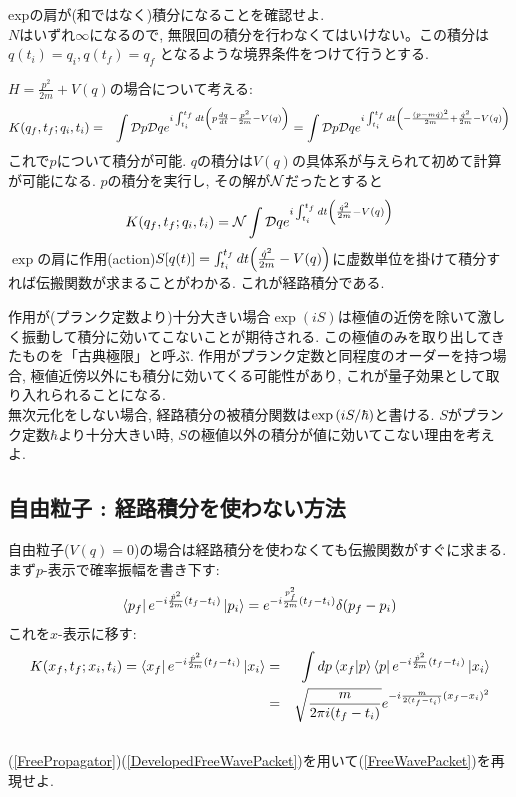 \documentclass[10.5pt,a4paper]{jreport}
\begin{document}
 expの肩が(和ではなく)積分になることを確認せよ.\\

$N$はいずれ$\infty$になるので, 無限回の積分を行わなくてはいけない。この積分は $q(t_i) = q_i, q(t_f) = q_f$ となるような境界条件をつけて行うとする.

$H = \frac{p^2}{2m} + V(q)$の場合について考える:
\begin{eqnarray}
  K(q_f, t_f;q_i, t_i) &=& \int {\cal D}p{\cal D}qe^{i\int_{t_i}^{t_f}dt\qty(p\frac{dq}{dt} - \frac{p^2}{2m} - V(q))} = \int {\cal D}p{\cal D}qe^{i\int_{t_i}^{t_f}dt\qty(-\frac{(p-m\dot{q})^2}{2m} + \frac{\dot{q}^2}{2m} - V(q))}
\end{eqnarray}
これで$p$について積分が可能. $q$の積分は$V(q)$の具体系が与えられて初めて計算が可能になる. $p$の積分を実行し, その解が${\cal N}$だったとすると
\begin{eqnarray}
  K(q_f, t_f;q_i, t_i) = {\cal N}\int {\cal D}qe^{i\int_{t_i}^{t_f}dt\qty(\frac{\dot{q}^2}{2m} - V(q))}\label{FeynmanPropagator}
\end{eqnarray}
$\exp$の肩に作用(action)$S[q(t)] = \int_{t_i}^{t_f}dt\qty(\frac{\dot{q}^2}{2m} - V(q))$に虚数単位を掛けて積分すれば伝搬関数が求まることがわかる. これが経路積分である.

作用が(プランク定数より)十分大きい場合$\exp(iS)$は極値の近傍を除いて激しく振動して積分に効いてこないことが期待される. この極値のみを取り出してきたものを「古典極限」と呼ぶ. 作用がプランク定数と同程度のオーダーを持つ場合, 極値近傍以外にも積分に効いてくる可能性があり, これが量子効果として取り入れられることになる.\\

 無次元化をしない場合, 経路積分の被積分関数は$\exp\qty(iS/\hbar)$と書ける. $S$がプランク定数$\hbar$より十分大きい時, $S$の極値以外の積分が値に効いてこない理由を考えよ. 

\subsection{自由粒子 : 経路積分を使わない方法}
自由粒子($V(q) = 0$)の場合は経路積分を使わなくても伝搬関数がすぐに求まる. まず$p$-表示で確率振幅を書き下す:
\begin{eqnarray}
  \bra{p_f}e^{-i\frac{\hat{p}^2}{2m}(t_f - t_i)}\ket{p_i} = e^{-i\frac{p_f^2}{2m}(t_f - t_i)}\delta(p_f - p_i)
\end{eqnarray}
これを$x$-表示に移す:
\begin{eqnarray}
 K(x_f, t_f;x_i, t_i) = \bra{x_f}e^{-i\frac{\hat{p}^2}{2m}(t_f - t_i)}\ket{x_i} &=& \int dp\bra{x_f}\ket{p}\bra{p}e^{-i\frac{\hat{p}^2}{2m}(t_f - t_i)}\ket{x_i}\\
  &=&\sqrt{\frac{m}{2\pi i(t_f-t_i)}}e^{-i\frac{m}{2(t_f - t_i)}(x_f - x_i)^2}\label{FreePropagator}
\end{eqnarray}\\
 (\ref{FreePropagator})(\ref{DevelopedFreeWavePacket})を用いて(\ref{FreeWavePacket})を再現せよ.
\end{document}
